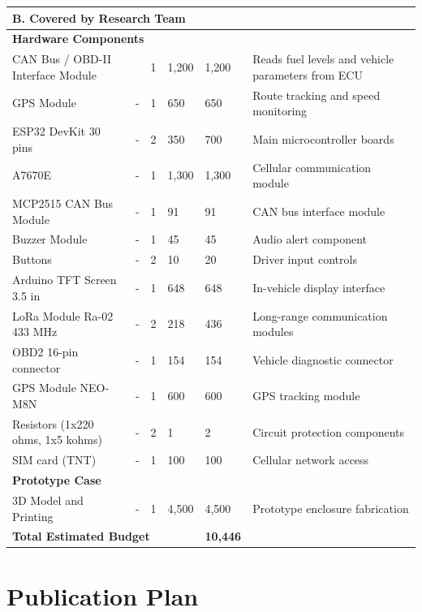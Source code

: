 \begin{SingleSpace}
\begin{longtable}{|p{}|p{}|p{}|p{}|p{}|p{}|}
\multicolumn{6}{|l|}{\textbf{B. Covered by Research Team}} \\
\hline
\multicolumn{6}{|l|}{\textbf{Hardware Components}} \\
\hline
CAN Bus / OBD-II Interface Module & & 1 & 1,200 & 1,200 & Reads fuel levels and vehicle parameters from ECU \\
GPS Module & - & 1 & 650 & 650 & Route tracking and speed monitoring \\
ESP32\glsadd{ESP32} DevKit 30 pins & - & 2 & 350 & 700 & Main microcontroller boards \\
A7670E & - & 1 & 1,300 & 1,300 & Cellular communication module \\
MCP2515 CAN Bus Module & - & 1 & 91 & 91 & CAN bus interface module \\
Buzzer Module & - & 1 & 45 & 45 & Audio alert component \\
Buttons & - & 2 & 10 & 20 & Driver input controls \\
Arduino TFT\glsadd{TFT} Screen 3.5 in & - & 1 & 648 & 648 & In-vehicle display interface \\
LoRa Module Ra-02 433 MHz & - & 2 & 218 & 436 & Long-range communication modules \\
OBD2 16-pin connector & - & 1 & 154 & 154 & Vehicle diagnostic connector \\
GPS Module NEO-M8N & - & 1 & 600 & 600 & GPS tracking module \\
Resistors (1x220 ohms, 1x5 kohms) & - & 2 & 1 & 2 & Circuit protection components \\
SIM card (TNT) & - & 1 & 100 & 100 & Cellular network access \\
\hline
\multicolumn{6}{|l|}{\textbf{Prototype Case}} \\
\hline
3D Model and Printing & - & 1 & 4,500 & 4,500 & Prototype enclosure fabrication \\
\hline

\multicolumn{4}{|l|}{\textbf{Total Estimated Budget}} & \textbf{10,446} & \\
\hline

\end{longtable}
\end{SingleSpace}


\ifPhD
\section{Publication Plan}
\graytx{\blindtext}
\fi



